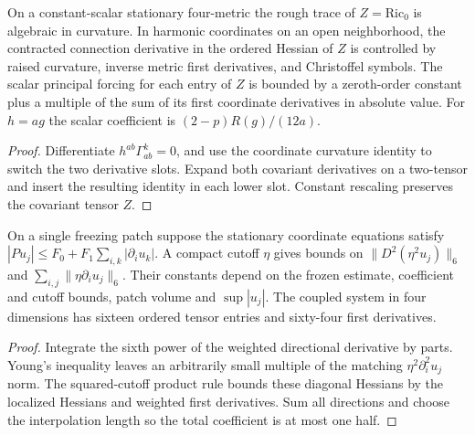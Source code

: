 \begin{proposition}
\label{prop:ed51-principal}
\leanok
On a constant-scalar stationary four-metric the rough trace of $Z=\mathrm{Ric}_0$
is algebraic in curvature. In harmonic coordinates on an open neighborhood,
the contracted connection derivative in the ordered Hessian of $Z$ is
controlled by raised curvature, inverse metric first derivatives, and
Christoffel symbols. The scalar principal forcing for each entry of $Z$
is bounded by a zeroth-order constant plus a multiple of the sum of its
first coordinate derivatives in absolute value. For $h=ag$ the scalar
coefficient is $(2-p)R(g)/(12a)$.
\end{proposition}
\begin{proof}
\leanok
Differentiate $h^{ab}\Gamma^k_{ab}=0$, and use the coordinate curvature
identity to switch the two derivative slots. Expand both covariant
derivatives on a two-tensor and insert the resulting identity in each
lower slot. Constant rescaling preserves the covariant tensor $Z$.
\end{proof}

\begin{proposition}
\label{prop:ed51-cutoff}
\leanok
On a single freezing patch suppose the stationary coordinate equations satisfy
$|Pu_j|\le F_0+F_1\sum_{i,k}|\partial_i u_k|$. A compact cutoff $\eta$ gives
bounds on $\|D^2(\eta^2u_j)\|_6$ and $\sum_{i,j}\|\eta\partial_i u_j\|_6$.
Their constants depend on the frozen estimate, coefficient and cutoff
bounds, patch volume and $\sup |u_j|$. The coupled system in four dimensions
has sixteen ordered tensor entries and sixty-four first derivatives.
\end{proposition}
\begin{proof}
\leanok
Integrate the sixth power of the weighted directional derivative by parts.
Young's inequality leaves an arbitrarily small multiple of the matching
$\eta^2\partial_i^2u_j$ norm. The squared-cutoff product rule bounds
these diagonal Hessians by the localized Hessians and weighted first
derivatives. Sum all directions and choose the interpolation length so
the total coefficient is at most one half.
\end{proof}

